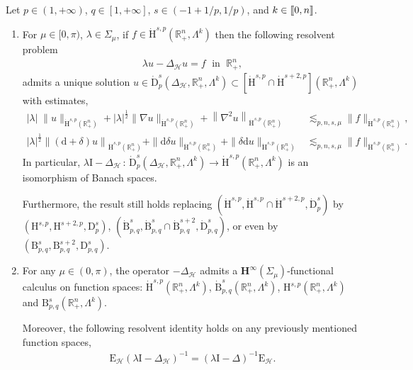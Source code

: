 \documentclass[AHL,Unicode,longabstracts,published]{cedram}
\newcommand{\bbR}{\mathbb{R}}
\newcommand{\rmH}{\mathrm{H}}%
\newcommand{\rmB}{\mathrm{B}}
\newcommand{\rmd}{\mathrm{d}}
\newcommand{\rmD}{\mathrm{D}}
\newcommand{\rmE}{\mathrm{E}}
\newcommand{\rmI}{\mathrm{I}}
\newcommand{\clH}{\mathcal{H}}
\newcommand{\bfH}{\mathbf{H}}
\newcommand{\llbracket}{\mathopen{[\mkern -2.7mu[}}
\newcommand{\rrbracket}{\mathclose{]\mkern -2.7mu]}}
\newcommand{\llb}{\llbracket}
\newcommand{\rrb}{\rrbracket}
\newcommand*{\romanenumi}{\renewcommand*{\theenumi}{\roman{enumi}}}
\begin{document}
\begin{theo}\label{thm:MetaThm1HodgeLaplacianRn+}
Let $p\in(1,+\infty)$, $q\in[1,+\infty]$, $s\in (-1+1/p,1/p)$, and $k\in\llb 0,n\rrb$.
\begin{enumerate}\romanenumi
\item\label{theo2.29.1} For $\mu\in[0,\pi)$, $\lambda\in\Sigma_\mu$, if $f\in \dot{\rmH}^{s,p}(\bbR^n_+,\Lambda^k)$ then the following resolvent problem
\begin{align*}
\lambda u - \Delta_{\clH} u = f\;\text{ in }\; \bbR^n_+,
\end{align*}
admits a unique solution $u\in \dot{\rmD}^{s}_{p}(\Delta_{\clH},\bbR^n_+,\Lambda^k) \subset[\dot{\rmH}^{s,p}\cap \dot{\rmH}^{s+2,p}](\bbR^n_+,\Lambda^k)$ with estimates,
\begin{align*}
|\lambda|\;\| u\|_{\dot{\rmH}^{s,p}\left(\bbR^n_+\right)}+|\lambda|^\frac{1}{2}\| \nabla u\|_{\dot{\rmH}^{s,p}\left(\bbR^n_+\right)}+\left\| \nabla^2 u\right\|_{\dot{\rmH}^{s,p}\left(\bbR^n_+\right)} &\lesssim_{p,n,s,\mu} \| f\|_{\dot{\rmH}^{s,p}\left(\bbR^n_+\right)} ,\\
|\lambda|^\frac{1}{2}\left\| (\rmd+\delta) u\right\|_{\dot{\rmH}^{s,p}\left(\bbR^n_+\right)}+\| \rmd\delta u\|_{\dot{\rmH}^{s,p}\left(\bbR^n_+\right)} + \| \delta\rmd u\|_{\dot{\rmH}^{s,p}\left(\bbR^n_+\right)} &\lesssim_{p,n,s,\mu} \| f\|_{\dot{\rmH}^{s,p}\left(\bbR^n_+\right)} .
\end{align*}
In particular, $\lambda \rmI -\Delta_{\clH}\,:\,\dot{\rmD}^{s}_{p}(\Delta_{\clH},\bbR^n_+,\Lambda^k)\longrightarrow \dot{\rmH}^{s,p}(\bbR^n_+,\Lambda^k)$ is an isomorphism of Banach spaces.

Furthermore, the result still holds replacing $(\dot{\rmH}^{s,p},\dot{\rmH}^{s,p}\cap \dot{\rmH}^{s+2,{p}},\dot{\rmD}^{s}_{p})$ by $({\rmH}^{s,p},{\rmH}^{s+2,p},{\rmD}^{s}_{p})$, $(\dot{\rmB}^{s}_{p,q},\dot{\rmB}^{s}_{p,q}\cap \dot{\rmB}^{s+2}_{p,q},\dot{\rmD}^{s}_{p,q})$, or even by $({\rmB}^{s}_{p,q},{\rmB}^{s+2}_{p,q},{\rmD}^{s}_{p,q})$.

\item\label{theo2.29.2} For any $\mu\in(0,\pi)$, the operator $-\Delta_{\clH}$ admits a $\bfH^\infty(\Sigma_\mu)$-functional calculus on function spaces: $\dot{\rmH}^{s,p}(\bbR^n_+,\Lambda^k)$,
$\dot{\rmB}^{s}_{p,q}(\bbR^n_+,\Lambda^k)$,
${\rmH}^{s,p}(\bbR^n_+,\Lambda^k)$ and
${\rmB}^{s}_{p,q}(\bbR^n_+,\Lambda^k)$.

Moreover, the following resolvent identity holds on any previously mentioned function spaces,
\begin{align*}
\rmE _{\clH}(\lambda \rmI  - \Delta_{\clH})^{-1} = (\lambda \rmI  - \Delta)^{-1}\rmE _{\clH}.
\end{align*}
\end{enumerate}
\end{theo}
\end{document}
